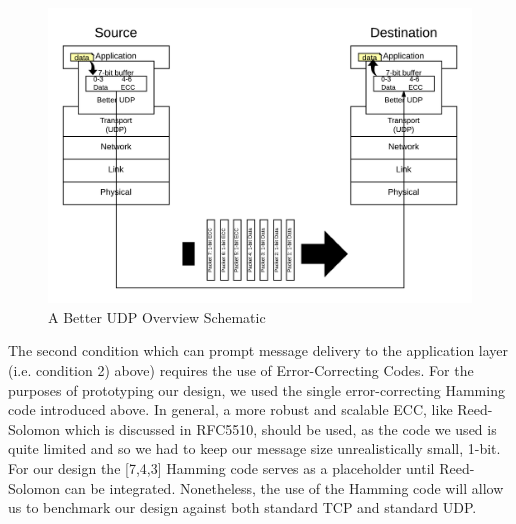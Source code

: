 \documentclass[conference]{IEEEtran}
\theoremstyle{definition}
\begin{document}
\begin{figure}[h!]                                                          %
\centering                                                                  %
  \includegraphics[scale=0.125]{PNGs/System_Schematic-Overview}             %
\caption{A Better UDP Overview Schematic}                                   %
\label{overview_schematic}                                                  %
\end{figure}                                                                %

The second condition which can prompt message
delivery to the application layer (i.e. condition 2)
above) requires the use of Error-Correcting Codes.
For the purposes of prototyping our design, we
used the single error-correcting Hamming
code introduced above.  In general, a more robust
and scalable ECC, like Reed-Solomon which is discussed
in RFC5510, should be used, as the code we used
is quite limited and so we had to keep
our message size unrealistically small, 1-bit.
For our design the [7,4,3] Hamming code serves as a
placeholder until Reed-Solomon can be integrated.
Nonetheless, the use of the Hamming code will
allow us to benchmark our design against both
standard TCP and standard UDP.
\end{document}
